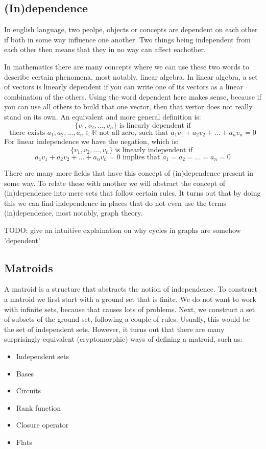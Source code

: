 \subsection{(In)dependence}

In english language, two peolpe, objects or concepts are dependent on each other if both in some way influence one another. Two things being independent from each other then means that they in no way can affect eachother. 

In mathematics there are many concepts where we can use these two words to describe certain phenomena, most notably, linear algebra. In linear algebra, a set of vectors is linearly dependent if you can write one of its vectors as a linear combination of the others. Using the word dependent here makes sense, because if you can use all others to build that one vector, then that vertor does not really stand on its own. An equivalent and more general definition is:
$$ \{v_1,v_2,\dots,v_n\} \text{ is linearly dependent if} $$ $$ \text{there exists } a_1,a_2,\dots,a_n \in \mathbb{R} \text{ not all zero, such that } a_1v_1+a_2v_2+\dots +a_nv_n = 0$$
For linear independence we have the negation, which is:
$$ \{v_1,v_2,\dots,v_n\} \text{ is linearly independent if } $$ $$ a_1v_1+a_2v_2+\dots+a_nv_n=0 \text{ implies that } a_1=a_2=\dots=a_n=0 $$

There are many more fields that have this concept of (in)dependence present in some way. To relate these with another we will abstract the concept of (in)dependence into mere sets that follow certain rules. It turns out that by doing this we can find independence in places that do not even use the terms (in)dependence, most notably, graph theory.

TODO: give an intuitive explaination on why cycles in graphs are somehow 'dependent'





\newpage

\subsection{Matroids}

A matroid is a structure that abstracts the notion of independence. To construct a matroid we first start with a ground set that is finite. We do not want to work with infinite sets, because that causes lots of problems. Next, we construct a set of subsets of the ground set, following a couple of rules. Usually, this would be the set of independent sets. However, it turns out that there are many surprisingly equivalent (cryptomorphic) ways of defining a matroid, such as:
\begin{itemize}
    \item Independent sets
    \item Bases
    \item Circuits
    \item Rank function
    \item Closure operator
    \item Flats
\end{itemize}


